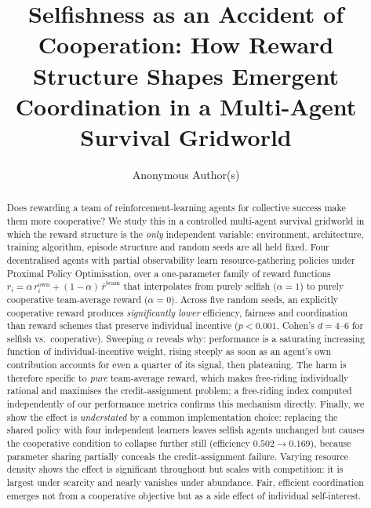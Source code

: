 \documentclass[sigconf,nonacm,anonymous,review]{acmart}
\begin{document}
\title{Selfishness as an Accident of Cooperation: How Reward Structure Shapes
Emergent Coordination in a Multi-Agent Survival Gridworld}

\author{Anonymous Author(s)}

\begin{abstract}
Does rewarding a team of reinforcement-learning agents for collective success make them
more cooperative? We study this in a controlled multi-agent survival gridworld in which the
reward structure is the \emph{only} independent variable: environment, architecture,
training algorithm, episode structure and random seeds are all held fixed. Four
decentralised agents with partial observability learn resource-gathering policies under
Proximal Policy Optimisation, over a one-parameter family of reward functions
$r_i = \alpha\, r_i^{\text{own}} + (1-\alpha)\,\bar r^{\text{team}}$ that interpolates from
purely selfish ($\alpha{=}1$) to purely cooperative team-average reward ($\alpha{=}0$).
Across five random seeds, an explicitly cooperative reward produces \emph{significantly
lower} efficiency, fairness and coordination than reward schemes that preserve individual
incentive ($p<0.001$, Cohen's $d = 4$--$6$ for selfish vs.\ cooperative). Sweeping $\alpha$
reveals why: performance is a saturating increasing function of individual-incentive weight,
rising steeply as soon as an agent's own contribution accounts for even a quarter of its
signal, then plateauing. The harm is therefore specific to \emph{pure} team-average reward,
which makes free-riding individually rational and maximises the credit-assignment problem;
a free-riding index computed independently of our performance metrics confirms this mechanism
directly. Finally, we show the effect is \emph{understated} by a common implementation choice:
replacing the shared policy with four independent learners leaves selfish agents unchanged
but causes the cooperative condition to collapse further still (efficiency $0.502\to0.169$),
because parameter sharing partially conceals the credit-assignment failure. Varying resource
density shows the effect is significant throughout but scales with competition: it is largest
under scarcity and nearly vanishes under abundance. Fair, efficient coordination emerges not
from a cooperative objective but as a side effect of individual self-interest.
\end{abstract}

\end{document}
